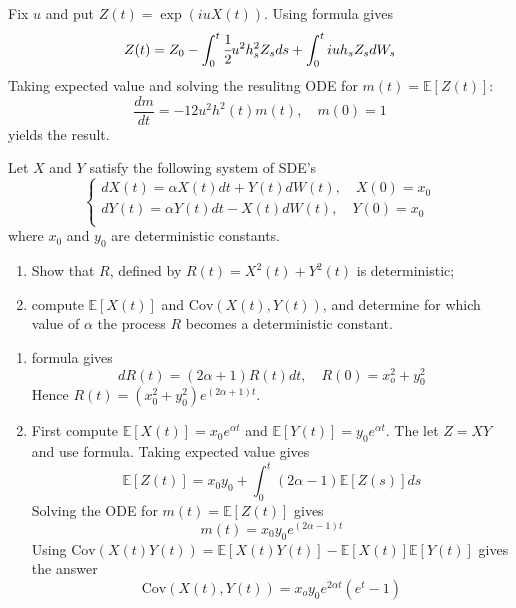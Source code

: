 \documentclass[12pt,a4paper]{exam}
\begin{document}
\begin{questions}
\begin{solution}
Fix $u$ and put $Z(t)=\exp (iuX(t))$. Using \ito formula gives
\begin{equation*}
Z(t) = Z_0 - \int_0^t \cfrac{1}{2}u^2h_s^2Z_s ds + \int_0^t iuh_sZ_sdW_s
\end{equation*}
Taking expected value and solving the resulitng ODE for $m(t)=\mathbb{E}[Z(t)]$:
\begin{equation*}
\frac{dm}{dt} = -{1}{2}u^2h^2(t)m(t), \quad m(0)=1
\end{equation*}
yields the result.
\end{solution}

\question Let $X$ and $Y$ satisfy the following system of SDE's
\begin{equation*}
\begin{cases}
dX(t) = \alpha X(t) dt + Y(t)dW(t), \quad X(0) = x_0\\
dY(t) = \alpha Y(t) dt - X(t)dW(t), \quad Y(0) = x_0\\
\end{cases}
\end{equation*}
where $x_0$ and $y_0$ are deterministic constants.
\begin{enumerate}[label=(\alph*),font=\itshape]
\item Show that $R$, defined by $R(t) = X^2(t)+Y^2(t)$ is deterministic;
\item compute $\mathbb{E}[X(t)]$ and $\text{Cov}(X(t), Y(t))$, and determine for which value of $\alpha$ the process $R$ becomes a deterministic constant.
\end{enumerate}
\fillwithlines{3cm}

\begin{solution}
\begin{enumerate}[label=(\alph*),font=\itshape]
\item \ito formula gives
\begin{equation*}
dR(t)=(2\alpha + 1)R(t)dt,\quad R(0)=x_o^2 + y_0^2
\end{equation*}
Hence $R(t) = (x_0^2 + y_0^2)e^{(2\alpha + 1)t}$.
\item First compute $\mathbb{E}[X(t)] = x_0e^{\alpha t}$ and  $\mathbb{E}[Y(t)] = y_0e^{\alpha t}$. The let $Z=XY$ and use \ito formula. Taking expected value gives
\begin{equation*} 
\mathbb{E}[Z(t)] = x_0y_0 + \int_0^t(2\alpha - 1)\mathbb{E}[Z(s)]ds
\end{equation*}
Solving the ODE for $m(t) = \mathbb{E}[Z(t)]$ gives 
\begin{equation*} 
m(t) = x_0y_0e^{(2\alpha - 1)t}
\end{equation*}
Using $\text{Cov}(X(t)Y(t))=\mathbb{E}[X(t)Y(t)]-\mathbb{E}[X(t)]\mathbb{E}[Y(t)]$ gives the answer
\begin{equation*} 
\text{Cov}(X(t), Y(t)) = x_oy_0e^{2\alpha t}(e^t - 1)
\end{equation*}
\end{enumerate}


\end{solution}
\end{questions}
\end{document}
